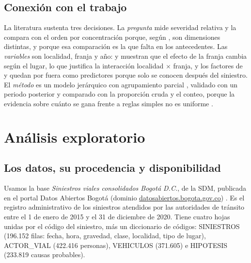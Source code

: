 \documentclass[10pt,twocolumn]{article}
\begin{document}
\subsection{Conexión con el trabajo}
La literatura sustenta tres decisiones. La \emph{pregunta} mide severidad relativa y la compara con el orden por concentración porque, según \citet{stipancic2019network}, son dimensiones distintas, y porque esa comparación es la que falta en los antecedentes. Las \emph{variables} son localidad, franja y año: \citet{zeng2023bayesian} y \citet{zou2017truck} muestran que el efecto de la franja cambia según el lugar, lo que justifica la interacción localidad $\times$ franja, y los factores de \citet{cantillo2020exploratory} y \citet{vergel2020examining} quedan por fuera como predictores porque solo se conocen después del siniestro. El \emph{método} es un modelo jerárquico con agrupamiento parcial \citep{hauer2002screening,johnson2022bayes}, validado con un periodo posterior y comparado con la proporción cruda y el conteo, porque la evidencia sobre cuánto se gana frente a reglas simples no es uniforme \citep{lim2013identifying,dong2016macroscopic}.

\section{Análisis exploratorio}\label{sec:eda}
\subsection{Los datos, su procedencia y disponibilidad}
Usamos la base \emph{Siniestros viales consolidados Bogotá D.C.}, de la SDM, publicada en el portal Datos Abiertos Bogotá (dominio \url{datosabiertos.bogota.gov.co}) \citep{sdm2021datos}. Es el registro administrativo de los siniestros atendidos por las autoridades de tránsito entre el 1 de enero de 2015 y el 31 de diciembre de 2020. Tiene cuatro hojas unidas por el código del siniestro, más un diccionario de códigos: SINIESTROS (196.152 filas: fecha, hora, gravedad, clase, localidad, tipo de lugar), ACTOR\_VIAL (422.416 personas), VEHICULOS (371.605) e HIPOTESIS (233.819 causas probables).
\end{document}
